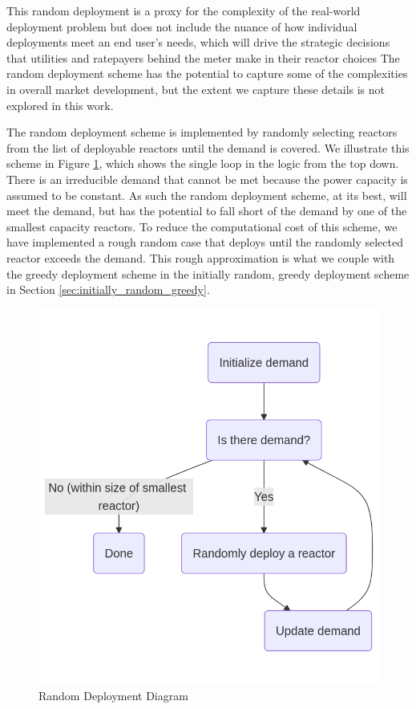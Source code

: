 This random deployment is a proxy for the complexity of the real-world
deployment problem but does not include the nuance of how individual
deployments meet an end user's needs, which will drive the strategic decisions
that utilities and ratepayers behind the meter make in their reactor choices
The random deployment scheme has the potential to capture some of the
complexities in overall market development, but the extent we capture these
details is not explored in this work.

The random deployment scheme is implemented by randomly selecting reactors from
the list of deployable reactors until the demand is covered. We illustrate this
scheme in Figure \ref{fig:random_diagram}, which shows the single loop in the
logic from the top down. There is an irreducible demand that cannot be met
because the power capacity is assumed to be constant. As such the random
deployment scheme, at its best, will meet the demand, but has the potential to
fall short of the demand by one of the smallest capacity reactors. To reduce
the computational cost of this scheme, we have implemented a rough random case
that deploys until the randomly selected reactor exceeds the demand. This rough
approximation is what we couple with the greedy deployment scheme in the
initially random, greedy deployment scheme in Section
\ref{sec:initially_random_greedy}.

\begin{figure}[!htbp]
    \centering
    \includegraphics[scale=0.4]{images/schemes/random_diagram.png}
    \caption{Random Deployment Diagram}
    \label{fig:random_diagram}
\end{figure}

